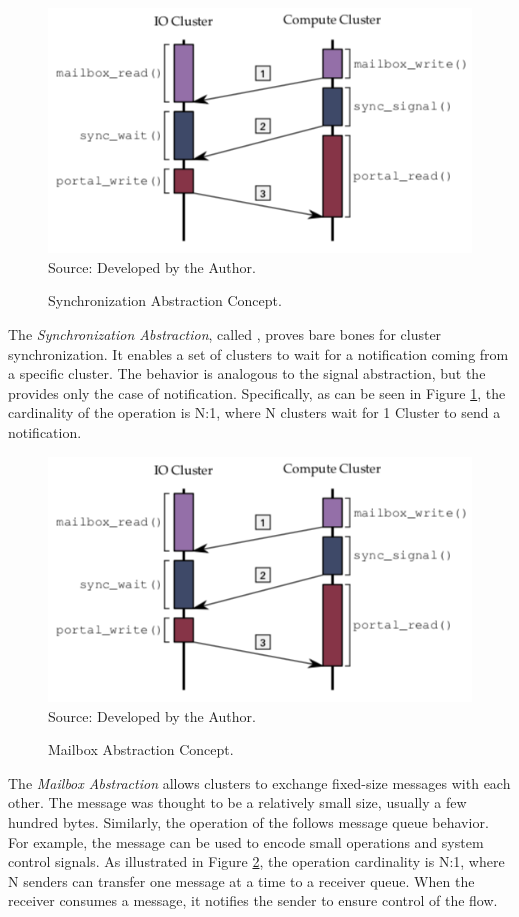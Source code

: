 			\label{sec.sync-abs}

				\begin{figure}[t]
					\centering
					\caption{Synchronization Abstraction Concept.}
					\includegraphics[width=.7\textwidth]{images/conceptual-sync.png}
					Source: Developed by the Author.
					\label{fig.conpt_sync}
				\end{figure}

				The \textit{Synchronization Abstraction}, called \sync, proves bare bones
				for cluster synchronization.
				It enables a set of clusters to wait for a notification coming from a
				specific cluster.
				The behavior is analogous to the \posix signal abstraction, but the \sync
				provides only the case of notification.
				Specifically, as can be seen in Figure \ref{fig.conpt_sync}, the
				cardinality of the operation is N:1, where N clusters wait for 1 Cluster
				to send a notification.

			\label{sec.mailbox-abs}

				\begin{figure}[t]
					\centering
					\caption{Mailbox Abstraction Concept.}
					\includegraphics[width=.7\textwidth]{images/conceptual-sync.png}
					Source: Developed by the Author.
					\label{fig.conpt_mailbox}
				\end{figure}

				The \textit{Mailbox Abstraction} allows clusters to exchange fixed-size
				messages with each other.
				The message was thought to be a relatively small size, usually a few hundred bytes.
				Similarly, the operation of the \mailbox follows \posix message queue behavior.
				For example, the message can be used to encode small operations and system
				control signals.
				As illustrated in Figure \ref{fig.conpt_mailbox}, the operation cardinality is N:1,
				where N senders can transfer one message at a time to a receiver queue.
				When the receiver consumes a message, it notifies the sender to ensure
				control of the flow.


